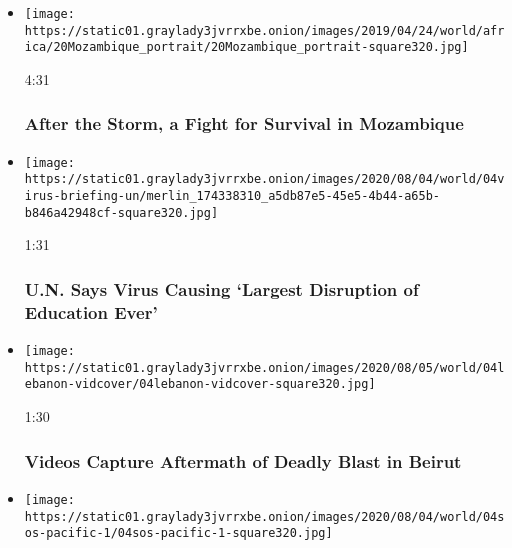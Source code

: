 \begin{itemize}
\item
  \href{https://www.nytimes3xbfgragh.onion/video/world/africa/100000006439514/mozambique-flood-cyclone-idai.html?action=click\&module=video-series-bar\&region=header\&pgtype=Article\&playlistId=video/world}{}

  \texttt{[image: https://static01.graylady3jvrrxbe.onion/images/2019/04/24/world/africa/20Mozambique\_portrait/20Mozambique\_portrait-square320.jpg]}

  4:31

  \hypertarget{after-the-storm-a-fight-for-survival-in-mozambique}{%
  \subsubsection{After the Storm, a Fight for Survival in
  Mozambique}\label{after-the-storm-a-fight-for-survival-in-mozambique}}
\item
  \href{https://www.nytimes3xbfgragh.onion/video/us/100000007272762/un-secretary-generational-catastrophe-schools-reopen.html?action=click\&module=video-series-bar\&region=header\&pgtype=Article\&playlistId=video/world}{}

  \texttt{[image: https://static01.graylady3jvrrxbe.onion/images/2020/08/04/world/04virus-briefing-un/merlin\_174338310\_a5db87e5-45e5-4b44-a65b-b846a42948cf-square320.jpg]}

  1:31

  \hypertarget{un-says-virus-causing-largest-disruption-of-education-ever}{%
  \subsubsection{U.N. Says Virus Causing `Largest Disruption of
  Education
  Ever'}\label{un-says-virus-causing-largest-disruption-of-education-ever}}
\item
  \href{https://www.nytimes3xbfgragh.onion/video/world/100000007272075/lebanon-beirut-blast.html?action=click\&module=video-series-bar\&region=header\&pgtype=Article\&playlistId=video/world}{}

  \texttt{[image: https://static01.graylady3jvrrxbe.onion/images/2020/08/05/world/04lebanon-vidcover/04lebanon-vidcover-square320.jpg]}

  1:30

  \hypertarget{videos-capture-aftermath-of-deadly-blast-in-beirut}{%
  \subsubsection{Videos Capture Aftermath of Deadly Blast in
  Beirut}\label{videos-capture-aftermath-of-deadly-blast-in-beirut}}
\item
  \texttt{[image: https://static01.graylady3jvrrxbe.onion/images/2020/08/04/world/04sos-pacific-1/04sos-pacific-1-square320.jpg]}


\end{itemize}
